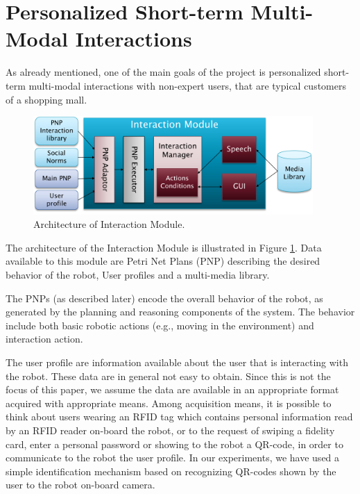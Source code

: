 \section{Personalized Short-term Multi-Modal Interactions}

As already mentioned, 
one of the main goals of the \coaches project is personalized short-term multi-modal interactions with non-expert users, that are typical customers of a shopping mall.




\begin{figure}
\centering
\includegraphics[width=0.95\textwidth]{fig/WP3.png}
\caption{Architecture of Interaction Module.}
\label{fig:WP3}
\end{figure}

The architecture of the Interaction Module is illustrated in Figure \ref{fig:WP3}. Data available to this module are Petri Net Plans (PNP) describing the desired behavior of the robot, User profiles and a multi-media library.

The PNPs (as described later) encode the overall behavior of the robot, as generated by the planning and reasoning components of the system. The behavior include both basic robotic actions (e.g., moving in the environment) and interaction action.

The user profile are information available about the user that is interacting with the robot. These data are in general not easy to obtain. Since this is not the focus of this paper, we assume the data are available in an appropriate format acquired with appropriate means.
Among acquisition means, it is possible to think about users wearing an RFID tag which contains personal information read by an RFID reader on-board the robot, or to the request of swiping a fidelity card, enter a personal password or showing to the robot a QR-code, in order to communicate to the robot the user profile.
In our experiments, we have used a simple identification mechanism based on recognizing QR-codes shown by the user to the robot on-board camera.


